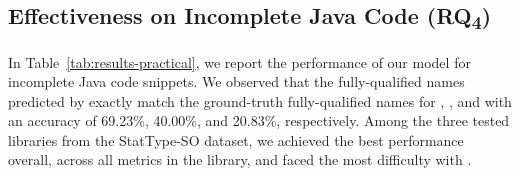 \subsection{Effectiveness on Incomplete Java Code (RQ\textsubscript{4})}
\label{sec:rq4}

In Table~\ref{tab:results-practical}, we report the performance of our model for incomplete Java code snippets. We observed that the fully-qualified names predicted by {\tool} exactly match the ground-truth fully-qualified names for , , and  with an accuracy of 69.23\%, 40.00\%, and 20.83\%, respectively. Among the three tested libraries from the StatType-SO dataset, we achieved the best performance overall, across all metrics in the  library, and \tool faced the most difficulty with .


